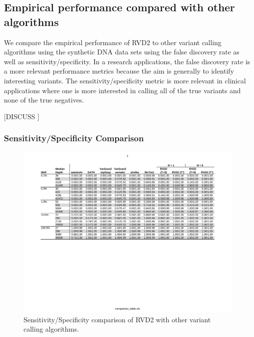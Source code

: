 \documentclass[11pt,reqno]{amsart}
\begin{document}
\subsection{Empirical performance compared with other algorithms}\label{sec:comparison}

We compare the empirical performance of RVD2 to other variant calling algorithms using the synthetic DNA data sets using the false discovery rate as well as sensitivity/specificity. In a research applications, the false discovery rate is a more relevant performance metrics because the aim is generally to identify interesting variants. The sensitivity/specificity metric is more relevant in clinical applications where one is more interested in calling all of the true variants and none of the true negatives.

[DISCUSS \citet{Stead:2013fu}] 

\subsubsection*{Sensitivity/Specificity Comparison}

\begin{figure}[h]
\begin{center}
\includegraphics[width=160mm]{pdf_figs/comparison_table_ss.pdf}
\caption{Sensitivity/Specificity comparison of RVD2 with other variant calling algorithms.}
\label{tbl:comparison_ss}
\end{center}
\end{figure}
\end{document}
